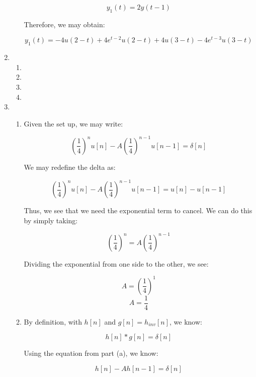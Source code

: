 \begin{enumerate}
\begin{enumerate}
        $$y_1(t)=2y(t-1)$$

        Therefore, we may obtain:

        $$\boxed{y_1(t)=-4u(2-t)+4e^{t-2}u(2-t)+4u(3-t)-4e^{t-3}u(3-t)}$$

    \end{enumerate}

  \item

    \begin{enumerate}

      \item 

      \item 

      \item 

      \item 

    \end{enumerate}

  \item

    \begin{enumerate}

      \item 

        Given the set up, we may write:

        $$\left( \frac{1}{4} \right)^nu[n]-A\left( \frac{1}{4} \right)^{n-1}u[n-1]=\delta[n]$$

        We may redefine the delta as:

        $$\left( \frac{1}{4} \right)^nu[n]-A\left( \frac{1}{4} \right)^{n-1}u[n-1]=u[n]-u[n-1]$$

        Thus, we see that we need the exponential term to cancel. We can do this by simply taking:

        $$\left( \frac{1}{4} \right)^n=A\left( \frac{1}{4} \right)^{n-1}$$

        Dividing the exponential from one side to the other, we see:

        $$A=\left( \frac{1}{4} \right)^1$$
        $$\boxed{A=\frac{1}{4}}$$

      \item 

        By definition, with $h[n]$ and $g[n]=h_{inv}[n]$, we know:

        $$h[n]*g[n]=\delta[n]$$

        Using the equation from part (a), we know:

        $$h[n]-Ah[n-1]=\delta[n]$$


\end{enumerate}
\end{enumerate}
